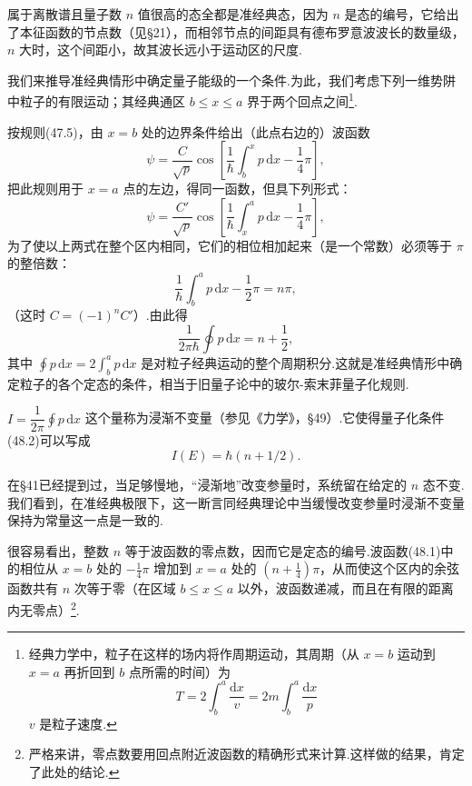 属于离散谱且量子数 $n$ 值很高的态全都是准经典态，因为 $n$ 是态的编号，它给出了本征函数的节点数（见§21），而相邻节点的间距具有德布罗意波波长的数量级，$n$ 大时，这个间距小，故其波长远小于运动区的尺度.

我们来推导准经典情形中确定量子能级的一个条件.为此，我们考虑下列一维势阱中粒子的有限运动；其经典通区 $b\leqslant x\leqslant a$ 界于两个回点之间\footnote{经典力学中，粒子在这样的场内将作周期运动，其周期（从 $x=b$ 运动到 $x=a$ 再折回到 $b$ 点所需的时间）为
\begin{equation*}
  T=2\int_b^a\frac{\mathrm{d}x}{v}=2m\int_b^a\frac{\mathrm{d}x}{p}
\end{equation*}
$v$ 是粒子速度.}.

按规则(47.5)，由 $x=b$ 处的边界条件给出（此点右边的）波函数
\begin{equation}
  \psi=\frac{C}{\sqrt{p}}\cos\left[\frac{1}{\hbar}\int_b^x p\,\mathrm{d}x-\frac{1}{4}\pi\right],
\end{equation}
把此规则用于 $x=a$ 点的左边，得同一函数，但具下列形式：
\begin{equation*}
  \psi=\frac{C'}{\sqrt{p}}\cos\left[\frac{1}{\hbar}\int_x^a p\,\mathrm{d}x-\frac{1}{4}\pi\right],
\end{equation*}
为了使以上两式在整个区内相同，它们的相位相加起来（是一个常数）必须等于 $\pi$ 的整倍数：
\begin{equation*}
  \frac{1}{\hbar}\int_b^a p\,\mathrm{d}x-\frac{1}{2}\pi=n\pi,
\end{equation*}
（这时 $C=(-1)^nC'$）.由此得
\begin{equation}
  \frac{1}{2\pi\hbar}\oint p\,\mathrm{d}x=n+\frac{1}{2},
\end{equation}
其中 $\oint p\,\mathrm{d}x=2\int_b^a p\,\mathrm{d}x$ 是对粒子经典运动的整个周期积分.这就是准经典情形中确定粒子的各个定态的条件，相当于旧量子论中的玻尔-索末菲量子化规则.

$I=\dfrac{1}{2\pi}\oint p\,\mathrm{d}x$ 这个量称为浸渐不变量（参见《力学》，§49）.它使得量子化条件(48.2)可以写成
\begin{equation*}
  I(E)=\hbar(n+1/2).
\end{equation*}

在§41已经提到过，当足够慢地，“浸渐地”改变参量时，系统留在给定的 $n$ 态不变.我们看到，在准经典极限下，这一断言同经典理论中当缓慢改变参量时浸渐不变量保持为常量这一点是一致的.

很容易看出，整数 $n$ 等于波函数的零点数，因而它是定态的编号.波函数(48.1)中的相位从 $x=b$ 处的 $-\frac{1}{4}\pi$ 增加到 $x=a$ 处的 $\left(n+\frac{1}{4}\right)\pi$，从而使这个区内的余弦函数共有 $n$ 次等于零（在区域 $b\leqslant x\leqslant a$ 以外，波函数递减，而且在有限的距离内无零点）\footnote{严格来讲，零点数要用回点附近波函数的精确形式来计算.这样做的结果，肯定了此处的结论.}.

